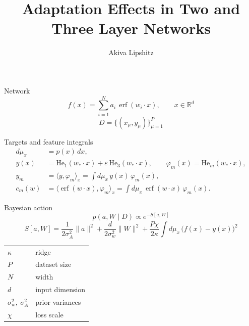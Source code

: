 \documentclass[aspectratio=169]{beamer}
\title{Adaptation Effects in Two and Three Layer Networks}
\author{Akiva Lipshitz}
\date{}
\begin{document}
\begin{frame}
  \titlepage
\end{frame}

\begin{frame}{Network}
  \begin{equation*}
    f(x)
    =
    \sum_{i=1}^{N}
    a_i\,
    \operatorname{erf}(w_i\cdot x),
    \qquad
    x\in\mathbb{R}^{d}
  \end{equation*}
  \begin{equation*}
    D=\{(x_\mu,y_\mu)\}_{\mu=1}^{P}
  \end{equation*}
\end{frame}

\begin{frame}{Targets and feature integrals}
  \begin{align*}
    d\mu_x
    &=
    p(x)\,dx,
    \\[1.2ex]
    y(x)
    &=
    \mathrm{He}_1(w_*\cdot x)
    +
    \varepsilon\,
    \mathrm{He}_3(w_*\cdot x),
    \qquad
    \varphi_m(x)
    =
    \mathrm{He}_m(w_*\cdot x),
    \\[1.2ex]
    y_m
    &=
    \langle y,\varphi_m\rangle_x
    =
    \int d\mu_x\,
    y(x)\,
    \varphi_m(x),
    \\[1.2ex]
    c_m(w)
    &=
    \langle\operatorname{erf}(w\cdot x),\varphi_m\rangle_x
    =
    \int d\mu_x\,
    \operatorname{erf}(w\cdot x)\,
    \varphi_m(x).
  \end{align*}
\end{frame}

\begin{frame}{Bayesian action}
  \begin{equation*}
    p(a,W\mid D)
    \propto
    e^{-S[a,W]}
  \end{equation*}
  \begin{equation*}
    S[a,W]
    =
    \frac{1}{2\sigma_A^{2}}\lVert a\rVert^{2}
    +
    \frac{d}{2\sigma_w^{2}}\lVert W\rVert^{2}
    +
    \frac{P\chi}{2\kappa}
    \int d\mu_x\,
    \bigl(f(x)-y(x)\bigr)^{2}
  \end{equation*}
  \vspace{0.6em}
  \begin{center}
  \small
  \begin{tabular}{ll}
    \(\kappa\) & ridge \\
    \(P\) & dataset size \\
    \(N\) & width \\
    \(d\) & input dimension \\
    \(\sigma_w^{2},\ \sigma_A^{2}\) & prior variances \\
    \(\chi\) & loss scale
  \end{tabular}
  \end{center}
\end{frame}
\end{document}
